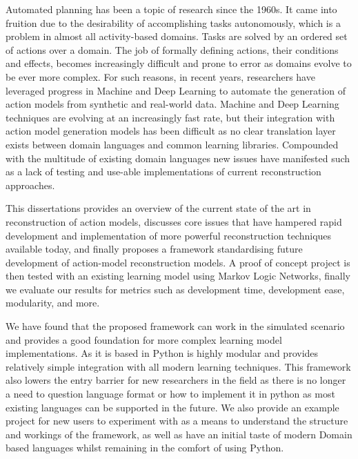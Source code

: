 
Automated planning has been a topic of research since the 1960s.
It came into fruition due to the desirability of accomplishing tasks autonomously, which is a problem in almost all
activity-based domains. Tasks are solved by an ordered set of actions over a domain. The job of formally defining
actions, their conditions and effects, becomes increasingly difficult and prone to error as domains evolve to be ever
more complex. For such reasons, in recent years, researchers have leveraged progress in Machine and Deep Learning to
automate the generation of action models from synthetic and real-world data. Machine and Deep Learning techniques
are evolving at an increasingly fast rate, but their integration with action model generation models has been difficult
as no clear translation layer exists between domain languages and common learning libraries.
Compounded with the multitude of existing domain languages new issues have manifested such
as a lack of testing and use-able implementations of current reconstruction approaches.

This dissertations provides an overview of the current state of the art in reconstruction of action models, discusses
core issues that have hampered rapid development and implementation of more powerful reconstruction techniques available
today, and finally proposes a framework standardising future development of action-model reconstruction models.
A proof of concept project is then tested with an existing learning model using Markov Logic Networks,
finally we evaluate our results for metrics such as development time, development ease, modularity, and more.

We have found that the proposed framework can work in the simulated scenario and provides a good foundation for more
complex learning model implementations. As it is based in Python is highly modular and provides relatively simple integration with
all modern learning techniques. This framework also lowers the entry barrier for new researchers in the field as there
is no longer a need to question language format or how to implement it in python as most existing
languages can be supported in the future. We also provide an example project for new users to experiment with as a
means to understand the structure and workings of the framework, as well as have an initial taste of modern
Domain based languages whilst remaining in the comfort of using Python.










